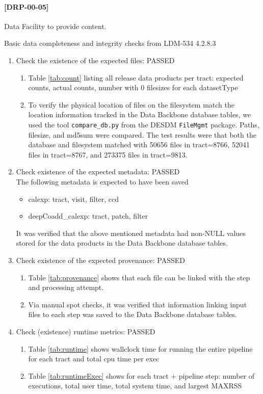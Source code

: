 \documentclass[DM,lsstdraft,STR,toc]{lsstdoc}
\begin{document}
\paragraph{[DRP-00-05]}
\begin{note}
Data Facility to provide content.
\end{note}
Basic data completeness and integrity checks from LDM-534 4.2.8.3






\begin{enumerate}
  \item Check the existence of the expected files: PASSED
  \begin{enumerate}
    \item Table \ref{tab:count} listing all release data products per tract:  expected counts, actual counts, number with 0 filesizes for each datasetType
    \item To verify the physical location of files on the filesystem
	  match the location information tracked in the Data Backbone
	  database tables, we used the tool
	  \texttt{compare{\_}db.py} from the DESDM \texttt{FileMgmt}
	  package.  Paths, filesize, and md5sum were compared. The test
	  results were that both the database and filesystem matched with 50656 files in tract=8766, 52041 files in tract=8767, and 273375 files in tract=9813.
  \end{enumerate}
  \item Check existence of the expected metadata: PASSED\\
    The following metadata is expected to have been saved
    \begin{itemize}
    \item calexp: tract, visit, filter, ccd
    \item deepCoadd\_calexp: tract, patch, filter
    \end{itemize}
    It was verified that the above mentioned metadata had non-NULL values stored for the data products in the Data Backbone database tables.
  \item Check existence of the expected provenance: PASSED
  \begin{enumerate}
    \item Table \ref{tab:provenance} shows that each file can be linked with the step and processing attempt.
    \item Via manual spot checks, it was verified that information linking input files to each step was saved to the Data Backbone database tables.
  \end{enumerate}
  \item Check (existence) runtime metrics: PASSED
  \begin{enumerate}
    \item Table \ref{tab:runtime} shows wallclock time for running the entire pipeline for each tract and total cpu time per exec
    \item Table \ref{tab:runtimeExec} shows for each tract + pipeline step:  number of executions, total user time, total system time, and largest MAXRSS
  \end{enumerate}
\end{enumerate}
\end{document}
